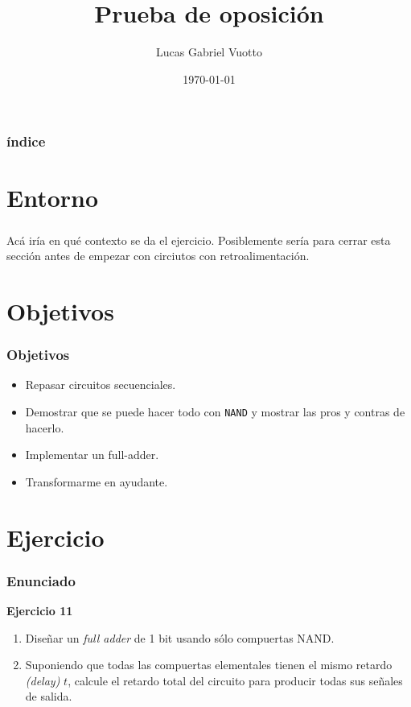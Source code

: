 \documentclass[hyperref={pdfpagelabels=false}]{beamer}
\title{Prueba de oposición}
\author{Lucas Gabriel Vuotto}
\date{\today}
\begin{document}
\begin{frame}
\titlepage %
\end{frame}


\begin{frame}
\frametitle{índice}
\tableofcontents
\end{frame}


\section{Entorno}

\begin{frame}
\frametitle{}
Acá iría en qué contexto se da el ejercicio. Posiblemente sería para cerrar
esta sección antes de empezar con circiutos con retroalimentación.
\end{frame}


\section{Objetivos}

\begin{frame}
\frametitle{Objetivos}
\begin{itemize}
  \item Repasar circuitos secuenciales.
  \item Demostrar que se puede hacer todo con \texttt{NAND} y mostrar las
  pros y contras de hacerlo.
  \item Implementar un full-adder.
  \item Transformarme en ayudante.
\end{itemize}
\end{frame}


\section{Ejercicio}

\begin{frame}
\frametitle{Enunciado}
\textbf{Ejercicio 11}
\begin{enumerate}
  \item Diseñar un \textit{full adder} de 1 bit usando sólo compuertas NAND.
  \item Suponiendo que todas las compuertas elementales tienen el mismo
  retardo \textit{(delay)} $t$, calcule el retardo total del circuito para
  producir todas sus señales de salida.
\end{enumerate}
\end{frame}
\end{document}

